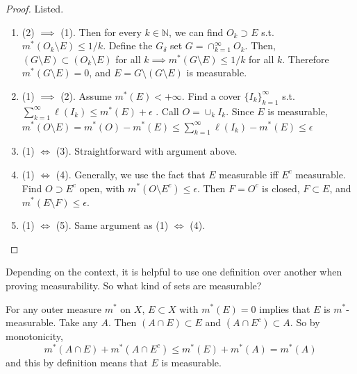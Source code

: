   \begin{proof}
    Listed. 
    \begin{enumerate}
      \item (2) $\implies$ (1). Then for every $k \in \mathbb{N}$, we can find $O_k \supset E$ s.t. $m^\ast (O_k \setminus E) \leq 1/k$. Define the $G_\delta$ set $G = \cap_{k=1}^\infty O_k$. Then, $(G \setminus E) \subset (O_k \setminus E)$ for all $k \implies m^\ast (G \setminus E) \leq 1/k$ for all $k$. Therefore $m^\ast (G \setminus E) = 0$, and $E = G \setminus (G \setminus E)$ is measurable. 

      \item (1) $\implies$ (2). Assume $m^\ast (E) < +\infty$. Find a cover $\{I_k \}_{k=1}^\infty$ s.t. $\sum_{k=1}^\infty \ell (I_k) \leq m^\ast (E) + \epsilon$ . Call $O = \cup_k I_k$. Since $E$ is measurable, $m^\ast (O \setminus E) = m^\ast (O) - m^\ast (E) \leq \sum_{k=1}^\infty \ell(I_k) - m^\ast (E) \leq \epsilon$ 

      \item (1) $\iff$ (3). Straightforward with argument above.  

      \item (1) $\iff$ (4). Generally, we use the fact that $E$ measurable iff $E^c$ measurable. Find $O \supset E^c$ open, with $m^\ast (O \setminus E^c) \leq \epsilon$. Then $F = O^c$ is closed, $F \subset E$, and $m^\ast (E \setminus F) \leq \epsilon$. 

      \item (1) $\iff$ (5). Same argument as (1) $\iff$ (4). 
    \end{enumerate}
  \end{proof}

  Depending on the context, it is helpful to use one definition over another when proving measurability. So what kind of sets are measurable? 

  \begin{example}
    For any outer measure $m^\ast$ on $X$, $E \subset X$ with $m^\ast (E) = 0$  implies that $E$ is $m^\ast$-measurable. Take any $A$. Then $(A \cap E) \subset E$ and $(A \cap E^c) \subset A$. So by monotonicity, 
    \begin{equation}
      m^\ast(A \cap E) + m^\ast (A \cap E^c) \leq m^\ast(E) + m^\ast(A) = m^\ast (A)
    \end{equation}
    and this by definition means that $E$ is measurable. 
  \end{example}

